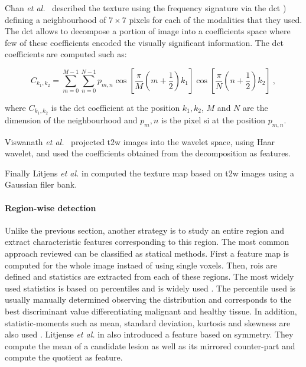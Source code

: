 Chan \textit{et al.}~\cite{Chan2003} described the texture using the frequency signature via the \acf{dct} \cite{Ahmed1974}) defining a neighbourhood of $7 \times 7$ pixels for each of the modalities that they used.
The \ac{dct} allows to decompose a portion of image into a coefficients space where few of these coefficients encoded the visually significant information.
The \ac{dct} coefficients are computed such as:

\begin{equation}
	C_{k_1,k_2} = \sum_{m=0}^{M-1} \sum_{n=0}^{N-1} p_{m,n} \cos \left[ \frac{\pi}{M} \left( m + \frac{1}{2} \right) k_1 \right] \cos \left[ \frac{\pi}{N} \left( n + \frac{1}{2} \right) k_2 \right] \ ,
\end{equation}

\noindent where $C_{k_1,k_2}$ is the \ac{dct} coefficient at the position $k_1,k_2$, $M$ and $N$ are the dimension of the neighbourhood and $p_m,n$ is the pixel \ac{si} at the position $p_{m,n}$.

Viswanath \textit{et al.}~\cite{Viswanath2012} projected \ac{t2w} images into the wavelet space, using Haar wavelet, and used the coefficients obtained from the decomposition as features.

Finally Litjens \textit{et al.} in \cite{Litjens2011} computed the texture map based on \ac{t2w} images using a Gaussian filer bank.


\paragraph{Region-wise detection}

Unlike the previous section, another strategy is to study an entire region and extract characteristic features corresponding to this region.
The most common approach reviewed can be classified as statical methods.
First a feature map is computed for the whole image instaed of using single voxels.
Then, \acp{roi} are defined and statistics are extracted from each of these regions.
The most widely used statistics is based on percentiles and is widely used \cite{Antic2013,Litjens2011,Litjens2012,Litjense2014,Peng2013,Tiwari2009a,Tiwari2010,Tiwari2013,Viswanath2008,Viswanath2008a,Viswanath2011,Viswanath2012,Vos2008,Vos2008a,Vos2010,Vos2012}.
The percentile used is usually manually determined observing the distribution and corresponds to the best discriminant value differentiating malignant and healthy tissue.
In addition, statistic-moments such as mean, standard deviation, kurtosis and skewness are also used \cite{Ampeliotis2007,Ampeliotis2008,Antic2013,Niaf2011,Niaf2012,Peng2013}.
Litjense \textit{et al.} in \cite{Litjense2014} also introduced a feature based on symmetry.
They compute the mean of a candidate lesion as well as its mirrored counter-part and compute the quotient as feature.


